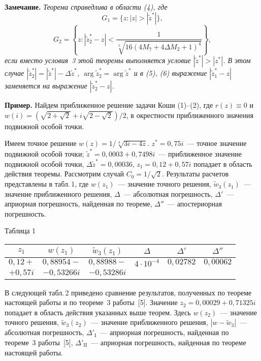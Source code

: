 \textbf{Замечание.} {\it Теорема справедлива в области (4), где
$$
G_{1} = \{ z\colon |z|> |\tilde z^{*}| \},
$$
$$
G_{2} = \left\{ z\colon |\tilde z_{2}^{*} -z| < \frac{1 }{\sqrt[\scriptstyle5]{16(4M_{7}+4\Delta
M_{2}+1)^{4}} } \right\},
$$
если вместо условия~3 этой теоремы выполняется условие $|\tilde z^{*}|> |z^{*}|$. В этом случае $|\tilde
z_{2}^{*}| = |\tilde z^{*}|- \Delta \tilde z^{*}$, $\arg \tilde z_{2}^{*} = \arg \tilde z^{*}$ и в (5), (6)
выражение $|\tilde z_{1}^{*}-z|$ заменяется на выражение $|\tilde z_{2}^{*}-z|$.}

\textbf{Пример.} Найдем приближенное решение задачи Коши (1)--(2), где $r(z)\equiv 0$ и $w(i) =
(\sqrt{2+\sqrt2}+i\sqrt{2-\sqrt2})/2$, в окрестности приближенного значения подвижной особой точки.

Имеем точное решение $w(z) = 1/\sqrt[\scriptstyle4]{3i-4z}$. $z^{*} = 0,75i$~--- точное значение подвижной
особой точки; $\tilde z^{*} = 0,0003+ 0,7498i$~--- приближенное значение подвижной особой точки, $\Delta
\tilde z^{*} = 0,00036$, $z_{1} = 0,12+0,57i$ попадает в область действия теоремы. Рассмотрим случай
$C_{0}=1/\sqrt2$. Результаты расчетов представлены в табл.\,1, где $w(z_{1})$~--- значение точного решения,
$\tilde w_{3}(z_{1})$~--- значение приближенного решения, $\Delta$~--- абсолютная погрешность, $\Delta'$~---
априорная погрешность, найденная по теореме, $\Delta''$~--- апостериорная погрешность.

\begin{table}[tb]
\footnotesize

{\raggedleft Таблица 1

}

\smallskip

{\tabcolsep=2.7mm

\bigskip

\begin{tabular}{|c|c|c|c|c|c|}
\hline
 $z_{1}$&$w(z_{1})$&$\tilde w_{3}(z_{1})$&$\Delta$&$\Delta'$&$\Delta''$\\
\hline
 $0,12+$&$0,88954-$&$0,88988-$&$4\cdot 10^{-4}$&$0,02782$&$0,00062$\\
 $+0,57i$&$-0,53266i$&$-0,53286i$&&&\\
\hline
\end{tabular}

}
\end{table}

В следующей табл.\,2 приведено сравнение результатов, полученных по теореме настоящей работы и по теореме~3
работы~[5]. Значение $z_{2} = 0,00029+ 0,71325i$ попадает в область действия указанных выше теорем. Здесь
$w(z_{2})$~--- значение точного решения, $\tilde w_{3}(z_{2})$~--- значение приближенного решения, $|w-\tilde
w_{3}|$~--- абсолютная погрешность, $\Delta'_{\mathrm{I}}$~--- априорная погрешность, найденная по теореме~3
работы~[5], $\Delta'_{\mathrm{II}}$~--- априорная погрешность, найденная по теореме настоящей \mbox{работы}.

